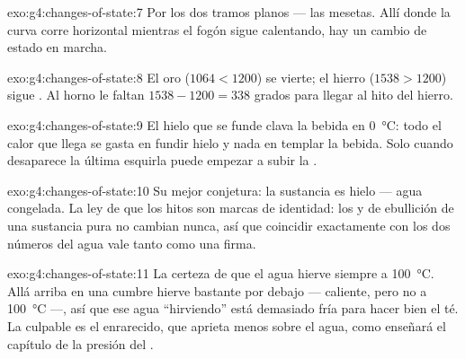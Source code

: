 \begin{solution}{exo:g4:changes-of-state:7}
Por los dos tramos planos --- las mesetas. Allí donde la curva corre
horizontal mientras el fogón sigue calentando, hay un cambio de estado
en marcha.
\end{solution}

\begin{solution}{exo:g4:changes-of-state:8}
El oro ($1064 < 1200$) se vierte; el hierro ($1538 > 1200$) sigue
. Al horno le faltan $1538 - 1200 = 338$ grados para llegar al
hito del hierro.
\end{solution}

\begin{solution}{exo:g4:changes-of-state:9}
El hielo que se funde clava la bebida en \qty{0}{\celsius}: todo el
calor que llega se gasta en fundir hielo y nada en templar la bebida.
Solo cuando desaparece la última esquirla puede empezar a subir la
.
\end{solution}

\begin{solution}{exo:g4:changes-of-state:10}
Su mejor conjetura: la sustancia es hielo --- agua congelada. La ley
de que los hitos son marcas de identidad: los  y de
ebullición de una sustancia pura no cambian nunca, así que
coincidir exactamente con los dos números del agua vale tanto como una
firma.
\end{solution}

\begin{solution}{exo:g4:changes-of-state:11}
La certeza de que el agua hierve siempre a \qty{100}{\celsius}. Allá
arriba en una cumbre hierve bastante por debajo --- caliente, pero no
a \qty{100}{\celsius} ---, así que ese agua ``hirviendo'' está
demasiado fría para hacer bien el té. La culpable es el 
enrarecido, que aprieta menos sobre el agua, como enseñará el capítulo
de la presión del .
\end{solution}
